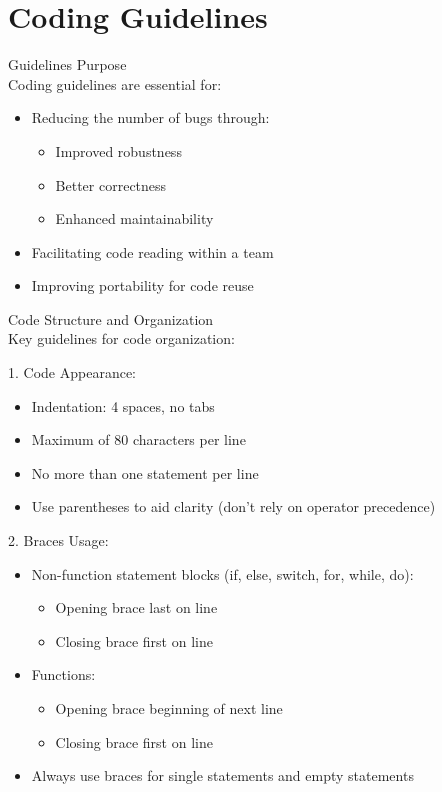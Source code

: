 \section{Coding Guidelines}

\begin{concept}{Guidelines Purpose}\\
Coding guidelines are essential for:
\begin{itemize}
  \item Reducing the number of bugs through:
    \begin{itemize}
      \item Improved robustness
      \item Better correctness
      \item Enhanced maintainability
    \end{itemize}
  \item Facilitating code reading within a team
  \item Improving portability for code reuse
\end{itemize}
\end{concept}

\begin{KR}{Code Structure and Organization}\\
Key guidelines for code organization:

1. Code Appearance:
\begin{itemize}
  \item Indentation: 4 spaces, no tabs
  \item Maximum of 80 characters per line
  \item No more than one statement per line
  \item Use parentheses to aid clarity (don't rely on operator precedence)
\end{itemize}

2. Braces Usage:
\begin{itemize}
  \item Non-function statement blocks (if, else, switch, for, while, do):
    \begin{itemize}
      \item Opening brace last on line
      \item Closing brace first on line
    \end{itemize}
  \item Functions:
    \begin{itemize}
      \item Opening brace beginning of next line
      \item Closing brace first on line
    \end{itemize}
  \item Always use braces for single statements and empty statements
\end{itemize}
\end{KR}

